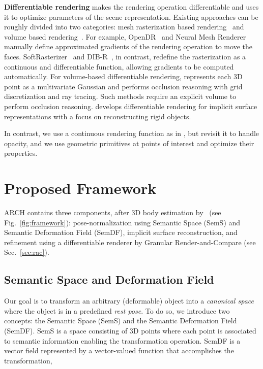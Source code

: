 \documentclass[10pt,twocolumn,letterpaper]{article}
\newcommand{\beforesection}{\vspace{-1mm}}
\newcommand{\aftersection}{\vspace{-1mm}}
\newcommand{\beforesubsection}{\vspace{0mm}}
\newcommand{\aftersubsection}{\vspace{0mm}}
\begin{document}
\textbf{Differentiable rendering} makes the rendering operation differentiable and uses it to optimize parameters of the scene representation. Existing approaches can be roughly divided into two categories: mesh rasterization based rendering~\cite{chen2019dibrender,kato2018renderer,liu2019softras,loper2014opendr,LiDRRayTrace18} and volume based rendering~\cite{EldarDRPointCloud18,liu2019ImplicitSurfDR}. For example, OpenDR~\cite{loper2014opendr} and Neural Mesh Renderer~\cite{kato2018renderer} manually define approximated gradients of the rendering operation to move the faces. SoftRasterizer~\cite{liu2019softras} and DIB-R~\cite{chen2019dibrender}, in contrast, redefine the rasterization as a continuous and differentiable function, allowing gradients to be computed automatically. For volume-based differentiable rendering, \cite{EldarDRPointCloud18} represents each 3D point as a multivariate Gaussian and performs occlusion reasoning with grid discretization and ray tracing. Such methods require an explicit volume to perform occlusion reasoning. \cite{liu2019ImplicitSurfDR} develops differentiable rendering for implicit surface representations with a focus on reconstructing rigid objects.

In contrast, we use a continuous rendering function as in \cite{liu2019softras}, but revisit it to handle opacity, and we use geometric primitives at points of interest and optimize their properties.

\beforesection
\section{Proposed Framework} \label{sec:method}
\aftersection

ARCH contains three components, after 3D body estimation by~\cite{DenseRaCICCV19} (see Fig.~\ref{fig:framework}):
pose-normalization using Semantic Space (SemS) and Semantic Deformation Field (SemDF), implicit surface reconstruction, and refinement using a differentiable renderer by Granular Render-and-Compare (see Sec.~\ref{sec:rac}).

\beforesubsection
\subsection{Semantic Space and Deformation Field} \label{sec:bdf}
\aftersubsection

Our goal is to transform an arbitrary (deformable) object into a \textit{canonical space} where the object is in a predefined \textit{rest pose}.
To do so, we introduce two concepts: the Semantic Space (SemS) and the Semantic Deformation Field (SemDF).
SemS  is a space consisting of 3D points where each point  is associated to semantic information  enabling the transformation operation. SemDF is a vector field represented by a vector-valued function  that accomplishes the transformation,
\end{document}

